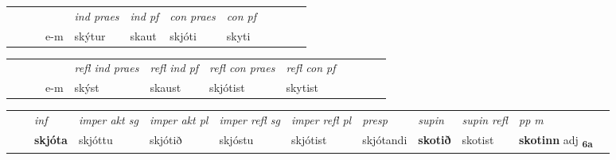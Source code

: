 \begin{tabular}{llllllllllll}
 & &  & &  \textit{ind praes} & \textit{ind pf} & \textit{con praes} & \textit{con pf} \\*
&  & & e-m & skýtur & skaut & skjóti & skyti \\*
\cmidrule{5-9}
\end{tabular}


\begin{tabular}{llllllllllll}
 & &  & &  \textit{refl ind praes} & \textit{refl ind pf} & \textit{refl con praes} & \textit{refl con pf} \\*
&  & & e-m & skýst & skaust & skjótist & skytist \\*
\cmidrule{5-9}
\end{tabular}


\begin{tabular}{llllllllllll}
 & & \textit{inf} & \textit{imper akt sg} & \textit{imper akt pl} & \textit{imper refl sg} & \textit{imper refl pl} & \textit{presp} & \textit{supin} & \textit{supin refl} & \textit{pp m}     \\*
  & & \textbf{skjóta} & skjóttu  & skjótið & skjóstu & skjótist & skjótandi &  \textbf{skotið} & skotist & \textbf{skotinn} adj \textbf{\textsubscript{6a}} \\*
\cmidrule{1-12}
\end{tabular}



